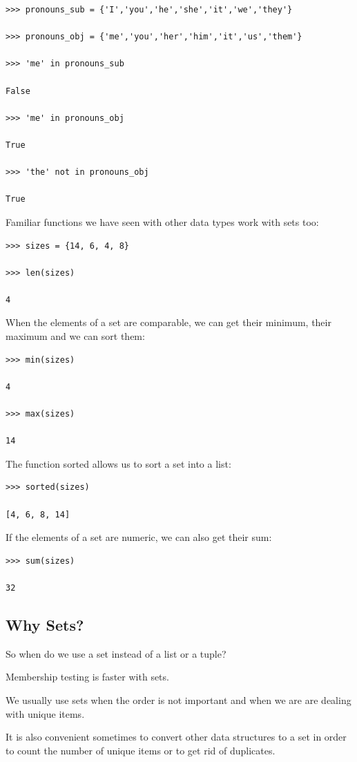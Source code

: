 \documentclass{article}
\begin{document}
\begin{lstlisting}
>>> pronouns_sub = {'I','you','he','she','it','we','they'}

>>> pronouns_obj = {'me','you','her','him','it','us','them'}

>>> 'me' in pronouns_sub

False

>>> 'me' in pronouns_obj

True

>>> 'the' not in pronouns_obj

True
\end{lstlisting}

Familiar functions we have seen with other data types work with sets too:

\begin{lstlisting}
>>> sizes = {14, 6, 4, 8}

>>> len(sizes)

4
\end{lstlisting}

When the elements of a set are comparable, we can get their minimum, their maximum and we can sort them:

\begin{lstlisting}
>>> min(sizes)

4

>>> max(sizes)

14
\end{lstlisting}

The function sorted allows us to sort a set into a list:
\begin{lstlisting}
>>> sorted(sizes)

[4, 6, 8, 14]
\end{lstlisting}

If the elements of a set are numeric, we can also get their sum:

\begin{lstlisting}
>>> sum(sizes)

32
\end{lstlisting}
\subsection{Why Sets?}
So when do we use a set instead of a list or a tuple?

Membership testing is faster with sets.

We usually use sets when the order is not important and when we are are dealing with unique items. 

It is also convenient sometimes to convert other data structures to a set in order to count the number of unique items or to get rid of duplicates.
\end{document}
